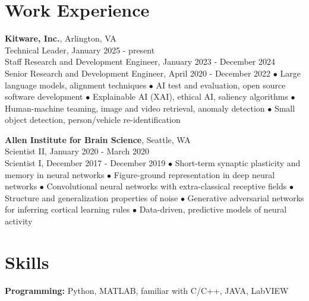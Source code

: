 \documentclass[10pt,letterpaper]{article}
\renewenvironment{itemize}{
  \begin{list}{}{
    \setlength{\leftmargin}{1.5em}
    \setlength{\itemsep}{0.25em}
    \setlength{\parskip}{0pt}
    \setlength{\parsep}{0.25em}
  }
}{
  \end{list}
}
\begin{document}
\vspace{-0.25in}

\section*{Work Experience}
\vspace{-0.05in}
\begin{itemize}
  \item \textbf{Kitware, Inc.}, Arlington, VA\\
  \noindent Technical Leader, January 2025 - present\\
  \noindent Staff Research and Development Engineer, January 2023 - December 2024\\
  \noindent Senior Research and Development Engineer, April 2020 - December 2022
  \subitem$\bullet$ Large language models, alignment techniques
  \subitem$\bullet$ AI test and evaluation, open source software development
  \subitem$\bullet$ Explainable AI (XAI), ethical AI, saliency algorithms
  \subitem$\bullet$ Human-machine teaming, image and video retrieval, anomaly detection
  \subitem$\bullet$ Small object detection, person/vehicle re-identification

  \item \textbf{Allen Institute for Brain Science}, Seattle, WA\\
  \noindent Scientist II, January 2020 - March 2020\\
  \noindent Scientist I, December 2017 - December 2019
  \subitem$\bullet$ Short-term synaptic plasticity and memory in neural networks
  \subitem$\bullet$ Figure-ground representation in deep neural networks
  \subitem$\bullet$ Convolutional neural networks with extra-classical receptive fields
  \subitem$\bullet$ Structure and generalization properties of noise
  \subitem$\bullet$ Generative adversarial networks for inferring cortical learning rules
  \subitem$\bullet$ Data-driven, predictive models of neural activity
\end{itemize}

\vspace{-0.25in}

\section*{Skills}
\vspace{-0.05in}
\hspace{1.5em}\textbf{Programming:} Python, MATLAB, familiar with C/C++, JAVA, LabVIEW
\end{document}
